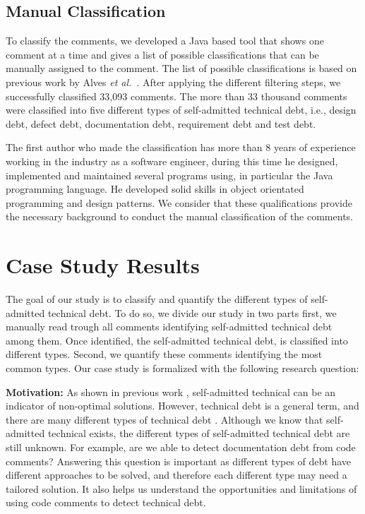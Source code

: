 \subsection{Manual Classification} 
\label{chap3:sub:manual_classification}

To classify the comments, we developed a Java based tool that shows one comment at a time and gives a list of possible classifications that can be manually assigned to the comment. The list of possible classifications is based on previous work by Alves \textit{et al.}~\cite{Alves2014MTD}. After applying the different filtering steps, we successfully classified 33,093 comments. The more than 33 thousand comments were classified into five different types of self-admitted technical debt, i.e., design debt, defect debt, documentation debt, requirement debt and test debt.

The first author who made the classification has more than 8 years of experience working in the industry as a software engineer, during this time he designed, implemented and maintained several programs using, in particular the Java programming language. He developed solid skills in object orientated programming and design patterns. We consider that these qualifications provide the necessary background to conduct the manual classification of the comments.   

\section{Case Study Results}
\label{chap3:sec:results}

The goal of our study is to classify and quantify the different types of self-admitted technical debt. To do so, we divide our study in two parts first, we manually read trough all comments identifying self-admitted technical debt among them. Once identified, the self-admitted technical debt, is classified into different types. Second, we quantify these comments identifying the most common types. Our case study is formalized with the following research question:

\vspace{3mm}
\noindent\chapterIIIrqi
\vspace{3mm}

\noindent\textbf{Motivation:} As shown in previous work \cite{Potdar2014ICSME}, self-admitted technical can be an indicator of non-optimal solutions. However, technical debt is a general term, and there are many different types of technical debt \cite{Alves2014MTD}. Although we know that self-admitted technical exists, the different types of self-admitted technical debt are still unknown. For example, are we able to detect documentation debt from code comments? Answering this question is important as different types of debt have different approaches to be solved, and therefore each different type may need a tailored solution. It also helps us understand the opportunities and limitations of using code comments to detect technical debt. 

